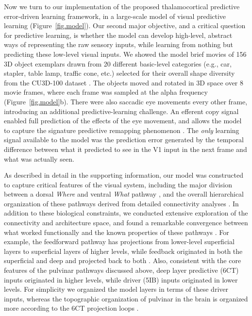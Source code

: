\documentclass[11pt,twoside]{article}
\newif\myifpdf
\begin{document}
Now we turn to our implementation of the proposed thalamocortical predictive error-driven learning framework, in a large-scale model of visual predictive learning (Figure~\ref{fig.model}).  Our second major objective, and a critical question for predictive learning, is whether the model can develop high-level, abstract ways of representing the raw sensory inputs, while learning from nothing but predicting these low-level visual inputs.  We showed the model brief movies of 156 3D object exemplars drawn from 20 different basic-level categories (e.g., car, stapler, table lamp, traffic cone, etc.) selected for their overall shape diversity from the CU3D-100 dataset \citep{OReillyWyatteHerdEtAl13}.  The objects moved and rotated in 3D space over 8 movie frames, where each frame was sampled at the alpha frequency (Figure~\ref{fig.model}b).  There were also saccadic eye movements every other frame, introducing an additional predictive-learning challenge.  An efferent copy signal enabled full prediction of the effects of the eye movement, and allows the model to capture the signature predictive remapping phenomenon \citep{DuhamelColbyGoldberg92,CavanaghHuntAfrazEtAl10,NeupaneGuittonPack17}.  The \emph{only} learning signal available to the model was the prediction error generated by the temporal difference between what it predicted to see in the V1 input in the next frame and what was actually seen.

As described in detail in the supporting information, our model was constructed to capture critical features of the visual system, including the major division between a dorsal \emph{Where} and ventral \emph{What} pathway \citep{UngerleiderMishkin82}, and the overall hierarchical organization of these pathways derived from detailed connectivity analyses \citep{RocklandPandya79,FellemanVanEssen91,MarkovVezoliChameauEtAl14,MarkovErcsey-RavaszGomesEtAl14}.  In addition to these biological constraints, we conducted extensive exploration of the connectivity and architecture space, and found a remarkable convergence between what worked functionally and the known properties of these pathways \citep{OReillyWyatteRohrlich17}.  For example, the feedforward pathway has projections from lower-level superficial layers to superficial layers of higher levels, while feedback originated in both the superficial and deep and projected back to both \citep{RocklandPandya79,FellemanVanEssen91}.  Also, consistent with the core features of the pulvinar pathways discussed above, deep layer predictive (6CT) inputs originated in higher levels, while driver (5IB) inputs originated in lower levels.  For simplicity we organized the model layers in terms of these driver inputs, whereas the topographic organization of pulvinar in the brain is organized more according to the 6CT projection loops \citep{Shipp03}.
\end{document}
